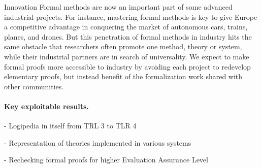 Innovation Formal methods are now an important part of some advanced
industrial projects. For instance, mastering formal methods is key to
give Europe a competitive advantage in conquering the market of
autonomous cars, trains, planes, and drones. But this penetration of
formal methods in industry hits the same obstacle that researchers
often promote one method, theory or system, while their industrial
partners are in search of universality. We expect to make formal
proofs more accessible to industry by avoiding each project to
redevelop elementary proofs, but instead benefit of the formalization
work shared with other communities.


\paragraph{Key exploitable results.}

- Logipedia in itself from TRL 3 to TLR 4

- Representation of theories implemented in various systems

- Rechecking formal proofs for higher Evaluation Assurance Level

